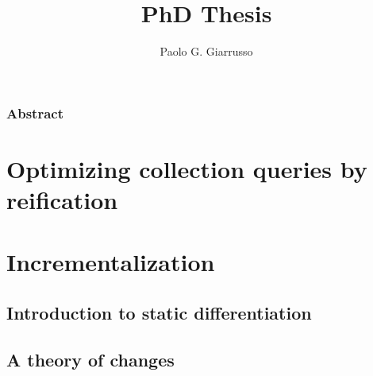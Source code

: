 \documentclass{book}
\title{PhD Thesis}
\author{Paolo G. Giarrusso}
\begin{document}
\maketitle


\section*{Abstract}

\tableofcontents



\part{Optimizing collection queries by reification}
\label{sec:ch-aosd13}





\part{Incrementalization}
\label{part:incr}
\chapter{Introduction to static differentiation}


\chapter{A theory of changes}
%







% 
% 

\begin{oldSec}

\end{oldSec}

\begin{oldSec}

\end{oldSec}


\end{document}
